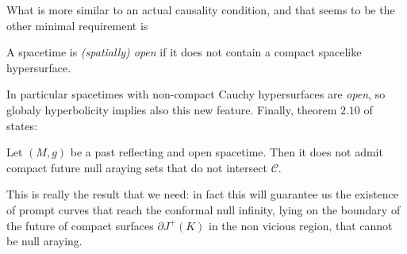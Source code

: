 	What is more similar to an actual causality condition, and that seems to be the other minimal requirement is
	\begin{definition}
		A spacetime is \emph{(spatially) open} if it does not contain a compact spacelike hypersurface.
	\end{definition}	
	In particular spacetimes with non-compact Cauchy hypersurfaces are \emph{open}, so globaly hyperbolicity implies also this new feature. 
	Finally, theorem \(2.10\) of \cite[]{minguzzi2020gravitational} states:
	\begin{theorem}
		Let \((M,g)\) be a past reflecting and open spacetime. Then it does not admit compact future null araying sets that do not intersect \(\mathcal{C}\).
	\end{theorem}
	This is really the result that we need: in fact this will guarantee us the existence of prompt curves that reach the conformal null infinity, lying on the boundary of the future of compact surfaces \(\partial J^+(K)\) in the non vicious region, that cannot be null araying.
